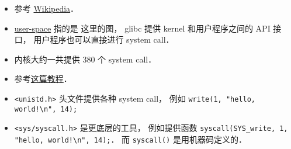 
\begin{issues}
\issueDraft
\end{issues}

\begin{itemize}
\item 参考 \href{https://en.wikipedia.org/wiki/Linux_kernel_interfaces}{Wikipedia}．
\item \href{https://en.wikipedia.org/wiki/User_space_and_kernel_space}{user-space} 指的是
这里的图， glibc 提供 kernel 和用户程序之间的 API 接口， 用户程序也可以直接进行 system call．
\item 内核大约一共提供 380 个 system call．
\item 参考\href{https://jameshfisher.com/2018/02/19/how-to-syscall-in-c/}{这篇教程}．
\item \verb|<unistd.h>| 头文件提供各种 system call， 例如 \verb|write(1, "hello, world!\n", 14);|
\item \verb|<sys/syscall.h>| 是更底层的工具， 例如提供函数 \verb|syscall(SYS_write, 1, "hello, world!\n", 14);|． 而 \verb|syscall()| 是用机器码定义的．
\end{itemize}
